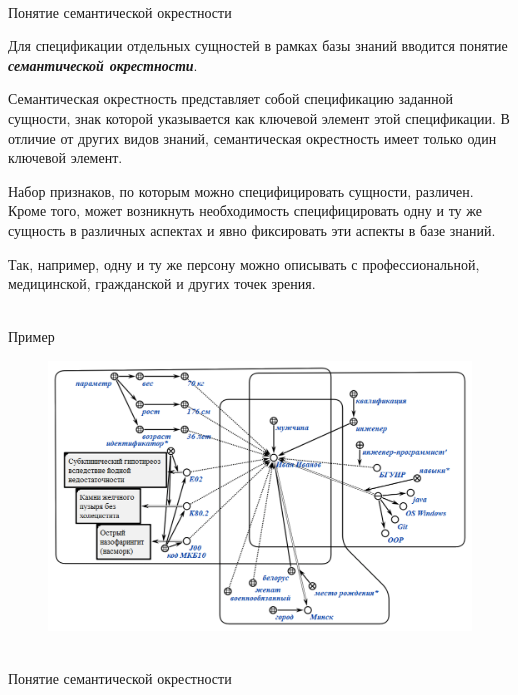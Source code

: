 \begin{frame}{\\Понятие семантической окрестности}
	\topline
	\justifying
	
	\vspace{5mm}
	Для спецификации отдельных сущностей в рамках базы знаний вводится понятие \textit{\textbf{семантической окрестности}}.
	
	Семантическая окрестность представляет собой спецификацию заданной сущности, знак которой указывается	как ключевой элемент этой спецификации. В отличие от других видов знаний, семантическая окрестность имеет только один ключевой элемент.
	
	Набор признаков, по которым можно специфицировать сущности, различен. Кроме того, может возникнуть необходимость специфицировать одну и ту же сущность в различных аспектах и явно фиксировать эти аспекты в базе знаний.
	
	Так, например, одну и ту же персону можно описывать с профессиональной, медицинской, гражданской и других точек зрения.
\end{frame}

\begin{frame}{\\Пример}
	\topline
	\justifying
	\vspace{10mm}
	
	\begin{figure}[H]
		\includegraphics[scale=0.5]{./figures/sd_structures/example.png}
	\end{figure}
\end{frame}

\begin{frame}{\\Понятие семантической окрестности}
	\topline
	\justifying
	
	\begin{SCn}
	\end{SCn}

\end{frame}

